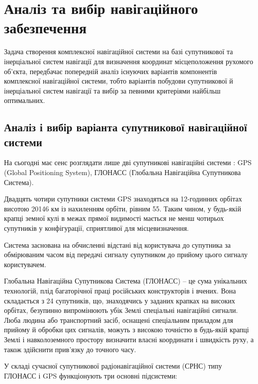 \section{Аналіз та вибір навігаційного забезпечення}

Задача створення комплексної навігаційної системи на базі супутникової та інерціальної 
систем навігації для визначення координат місцеположення рухомого об'єкта, передбачає 
попередній аналіз існуючих варіантів компонентів комплексної навігаційної системи, тобто 
варіантів побудови супутникової й  інерціальної систем навігації та вибір за певними критеріями найбільш оптимальних. 


\subsection{Аналіз і вибір варіанта супутникової навігаційної системи }

На сьогодні має сенс розглядати лише дві супутникові навігаційні системи : GPS (Global Positioning System), 
ГЛОНАСС (Глобальна Навігаційна Супутникова Система).

Двадцять чотири супутники системи GPS знаходяться на 12-годинних орбітах висотою 
20146 км із нахиленням орбіти, рівним 55. Таким чином, 
у будь-якій крапці земної кулі в межах прямої видимості мається не менш чотирьох супутників 
у конфігурації, сприятливої для місцевизначення.

Система заснована на обчисленні відстані від користувача до супутника за обмірюваним часом 
від передачі сигналу супутником до прийому цього сигналу користувачем.

Глобальна Навігаційна Супутникова Система (ГЛОНАСС) -- це сума унікальних 
технологій, плід багаторічної праці російських конструкторів і вчених. Вона складається 
з 24 супутників, що, знаходячись у заданих крапках на високих орбітах, безупинно випромінюють 
убік Землі спеціальні навігаційні сигнали. Люба людина або транспортний засіб, оснащені 
спеціальним приладом для прийому й обробки цих сигналів, можуть з високою точністю в 
будь-якій крапці Землі і навколоземного простору визначити власні координати і швидкість 
руху, а також здійснити прив'язку до точного часу.

У складі сучасної супутникової радіонавігаційної системи (СРНС) типу ГЛОНАСС і 
GPS функціонують три основні підсистеми:

